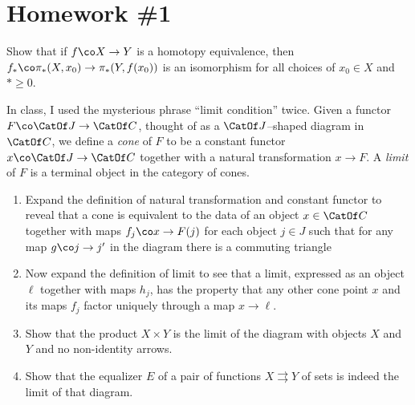 
\section{Homework \#1}

\begin{problem}
Show that if $f\co X \to Y$ is a homotopy equivalence, then $f_*\co \pi_*(X, x_0) \to \pi_*(Y, f(x_0))$ is an isomorphism for all choices of $x_0 \in X$ and $* \ge 0$.
\end{problem}

\begin{problem}
In class, I used the mysterious phrase ``limit condition'' twice.  Given a functor $F\co \CatOf J \to \CatOf C$, thought of as a $\CatOf J$--shaped diagram in $\CatOf C$, we define a \textit{cone} of $F$ to be a constant functor $x\co \CatOf J \to \CatOf C$ together with a natural transformation $x \to F$.  A \textit{limit} of $F$ is a terminal object in the category of cones.
\begin{enumerate}
    \item Expand the definition of natural transformation and constant functor to reveal that a cone is equivalent to the data of an object $x \in \CatOf C$ together with maps $f_j\co x \to F(j)$ for each object $j \in J$ such that for any map $g\co j \to j'$ in the diagram there is a commuting triangle
    \begin{center}
    \end{center}
    \item Now expand the definition of limit to see that a limit, expressed as an object $\ell$ together with maps $h_j$, has the property that any other cone point $x$ and its maps $f_j$ factor uniquely through a map $x \to \ell$.
    \item Show that the product $X \times Y$ is the limit of the diagram with objects $X$ and $Y$ and no non-identity arrows.
    \item Show that the equalizer $E$ of a pair of functions $X \rightrightarrows Y$ of sets is indeed the limit of that diagram.
\end{enumerate}
\end{problem}

